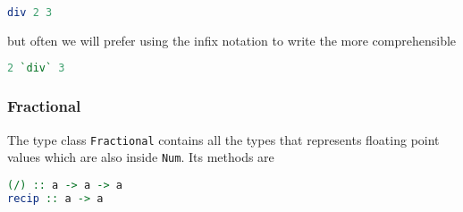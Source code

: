 \begin{lstlisting}[language=haskell]
div 2 3
\end{lstlisting}

but often we will prefer using the infix notation to write the more comprehensible

\begin{lstlisting}[language=haskell]
2 `div` 3
\end{lstlisting}


\subsubsection{Fractional}
The type class \texttt{Fractional} contains all the types that represents floating point values which are also inside \texttt{Num}. Its methods are

\begin{lstlisting}[language=haskell]
(/) :: a -> a -> a
recip :: a -> a
\end{lstlisting}
